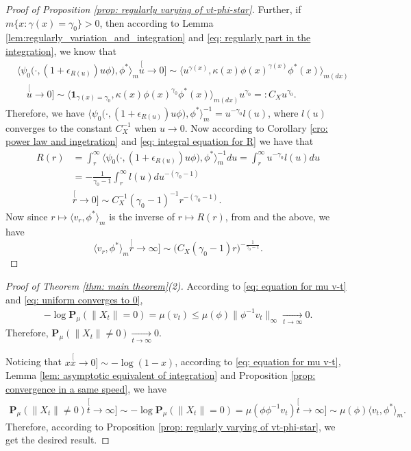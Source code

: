 \begin{proof}[Proof of Proposition \ref{prop: regularly varying of vt-phi-star}]
	Further, if $m\{x: \gamma(x) = \gamma_0\}> 0$, then according to Lemma \ref{lem:regularly_variation_and_integration} and \eqref{eq: regularly part in the integration}, we know that
\begin{align}
	&\big\langle \psi_0 \big(\cdot,( 1 + \epsilon_{R(u)} ) u \phi \big), \phi^* \big\rangle_m
	\stackrel[u\to 0]{}{\sim}  \langle u^{\gamma(x)} , \kappa (x)\phi(x)^{\gamma(x)} \phi^*(x)
	\rangle_{m(dx)}
	\\ &\quad \stackrel[u\to 0]{}{\sim}  \langle \mathbf 1_{\gamma(x)= \gamma_0}, \kappa (x)\phi(x)^{\gamma_0} \phi^*(x)
	\rangle_{m(dx)} u^{\gamma_0}
	=: C_X u^{\gamma_0}.
\end{align}
	Therefore, we have $\big\langle \psi_0 \big(\cdot,( 1 + \epsilon_{R(u)} ) u \phi \big), \phi^* \big\rangle_m^{-1} = u^{-\gamma_0} l(u)$, where $l(u)$ converges to the constant $C_X^{-1}$ when $u \to 0$.
	Now according to Corollary \ref{cro: power law and ingetration} and \eqref{eq: integral equation for R} we have that
\begin{align}
	R(r)
	&= \int_r^\infty \big\langle \psi_0 \big(\cdot,( 1 + \epsilon_{R(u)} ) u \phi \big), \phi^* \big\rangle_m^{-1} du
	= \int_r^\infty u^{-\gamma_0} l(u) du
	\\&= -\frac{1}{\gamma_0-1}\int_r^\infty l(u) du^{-(\gamma_0 - 1)}
	\\&\stackrel[r\to 0]{}{\sim} C_X^{-1} (\gamma_0-1)^{-1} r^{-(\gamma_0 - 1)}.
\end{align}
	Now since $r\mapsto \langle v_r,\phi^*\rangle_m$ is the inverse of $r\mapsto R(r)$, 
	from \cite[Proposition 1.5.15.]{BinghamGoldieTeugels1989Regular} and the above,
	we have
\begin{equation}
	\langle v_r,\phi^*\rangle_m
	\stackrel[r\to \infty]{}{\sim} \big(C_X (\gamma_0-1) r \big)^{-\frac{1}{\gamma_0 - 1}}. 
\end{equation}
\end{proof}

\begin{proof}[Proof of Theorem \ref{thm: main theorem}(2)]
	According to \eqref{eq: equation for mu v-t} and \eqref{eq: uniform converges to 0},
\begin{align}
	- \log \mathbf P_\mu(\|X_t\| = 0)
	= \mu(v_t)
	\leq \mu(\phi) \| \phi^{-1} v_t\|_{\infty}
	\xrightarrow[t\to \infty]{} 0.
\end{align}
	Therefore, $\mathbf P_\mu(\|X_t\| \neq 0) \xrightarrow[t\to \infty]{} 0$.

	Noticing that $x \stackrel[x\to 0]{}{\sim} - \log(1-x)$, according to \eqref{eq: equation for mu v-t}, Lemma \ref{lem: asymptotic equivalent of integration} and Proposition \ref{prop: convergence in a same speed}, we have
\begin{align}
	\mathbf P_\mu(\|X_t\| \neq 0)
	\stackrel[t\to \infty]{}{\sim} - \log \mathbf P_\mu(\|X_t\| = 0)
	= \mu(\phi \phi^{-1}v_t)
	\stackrel[t\to\infty]{}{\sim} \mu(\phi) \langle v_t, \phi^*\rangle_m.
\end{align}
	Therefore, according to Proposition \ref{prop: regularly varying of vt-phi-star}, we get the desired result.
\end{proof}

